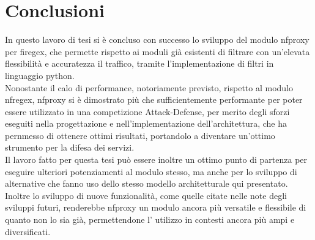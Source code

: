 \chapter*{Conclusioni}

In questo lavoro di tesi si è concluso con successo lo sviluppo del modulo nfproxy per firegex, che permette rispetto ai moduli già esistenti di filtrare con un'elevata flessibilità e accuratezza il traffico, tramite l'implementazione di filtri in linguaggio python.\\

Nonostante il calo di performance, notoriamente previsto, rispetto al modulo nfregex, nfproxy si è dimostrato più che sufficientemente performante per poter essere utilizzato in una competizione Attack-Defense, per merito degli sforzi eseguiti nella progettazione e nell'implementazione
dell'architettura, che ha pernmesso di ottenere ottimi risultati, portandolo a diventare un'ottimo strumento per la difesa dei servizi.\\

Il lavoro fatto per questa tesi può essere inoltre un ottimo punto di partenza per eseguire ulteriori potenziamenti al modulo stesso, ma anche per lo sviluppo di alternative che fanno uso dello stesso modello architetturale qui presentato.\\

Inoltre lo sviluppo di nuove funzionalità, come quelle citate nelle note degli sviluppi futuri, renderebbe nfproxy un modulo ancora più versatile e flessibile di quanto non lo sia già, permettendone l' utilizzo in contesti ancora più ampi e diversificati.\\

